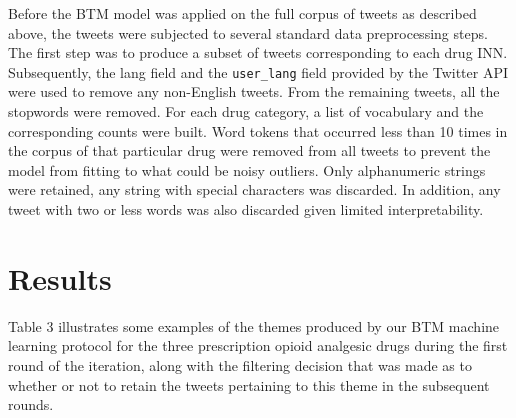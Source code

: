 Before the BTM model was applied on the full corpus of 
tweets as described above, the tweets were subjected to 
several standard data preprocessing steps. The first step 
was to produce a subset of tweets corresponding to each drug INN. 
Subsequently, the lang field and the \texttt{user\_lang} field provided 
by the Twitter API were used to remove any non-English tweets. 
From the remaining tweets, all the stopwords were removed. 
For each drug category, a list of vocabulary and the corresponding 
counts were built. Word tokens that occurred less than 
10 times in the corpus of that particular drug were removed 
from all tweets to prevent the model from fitting to what 
could be noisy outliers. Only alphanumeric strings were 
retained, any string with special characters was discarded. 
In addition, any tweet with two or less words was also 
discarded given limited interpretability.

\section{Results}
Table 3 illustrates some examples of the themes 
produced by our BTM machine learning protocol for the three 
prescription opioid analgesic drugs during the first round of the 
iteration, along with the filtering decision that was made as to 
whether or not to retain the tweets pertaining to 
this theme in the subsequent rounds.

